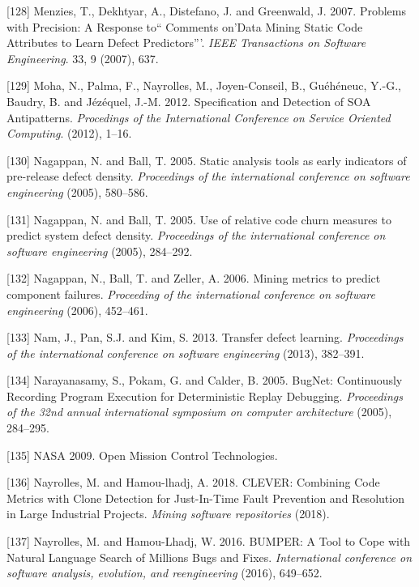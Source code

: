 \documentclass[12pt]{report}
\begin{document}
\hypertarget{ref-menzies2007problems}{}
{[}128{]} Menzies, T., Dekhtyar, A., Distefano, J. and Greenwald, J.
2007. Problems with Precision: A Response to`` Comments on'Data Mining
Static Code Attributes to Learn Defect Predictors'''. \emph{IEEE
Transactions on Software Engineering}. 33, 9 (2007), 637.

\hypertarget{ref-Moha}{}
{[}129{]} Moha, N., Palma, F., Nayrolles, M., Joyen-Conseil, B.,
Guéhéneuc, Y.-G., Baudry, B. and Jézéquel, J.-M. 2012. Specification and
Detection of SOA Antipatterns. \emph{Procedings of the International
Conference on Service Oriented Computing}. (2012), 1--16.

\hypertarget{ref-Nagappan2005}{}
{[}130{]} Nagappan, N. and Ball, T. 2005. Static analysis tools as early
indicators of pre-release defect density. \emph{Proceedings of the
international conference on software engineering} (2005), 580--586.

\hypertarget{ref-Nagappan}{}
{[}131{]} Nagappan, N. and Ball, T. 2005. Use of relative code churn
measures to predict system defect density. \emph{Proceedings of the
international conference on software engineering} (2005), 284--292.

\hypertarget{ref-Nagappan2006}{}
{[}132{]} Nagappan, N., Ball, T. and Zeller, A. 2006. Mining metrics to
predict component failures. \emph{Proceeding of the international
conference on software engineering} (2006), 452--461.

\hypertarget{ref-Nam2013}{}
{[}133{]} Nam, J., Pan, S.J. and Kim, S. 2013. Transfer defect learning.
\emph{Proceedings of the international conference on software
engineering} (2013), 382--391.

\hypertarget{ref-Narayanasamy2005}{}
{[}134{]} Narayanasamy, S., Pokam, G. and Calder, B. 2005. BugNet:
Continuously Recording Program Execution for Deterministic Replay
Debugging. \emph{Proceedings of the 32nd annual international symposium
on computer architecture} (2005), 284--295.

\hypertarget{ref-NASA2009}{}
{[}135{]} NASA 2009. Open Mission Control Technologies.

\hypertarget{ref-Nayrolles2018}{}
{[}136{]} Nayrolles, M. and Hamou-lhadj, A. 2018. CLEVER: Combining Code
Metrics with Clone Detection for Just-In-Time Fault Prevention and
Resolution in Large Industrial Projects. \emph{Mining software
repositories} (2018).

\hypertarget{ref-Nayrolles2016b}{}
{[}137{]} Nayrolles, M. and Hamou-Lhadj, W. 2016. BUMPER: A Tool to Cope
with Natural Language Search of Millions Bugs and Fixes.
\emph{International conference on software analysis, evolution, and
reengineering} (2016), 649--652.
\end{document}
